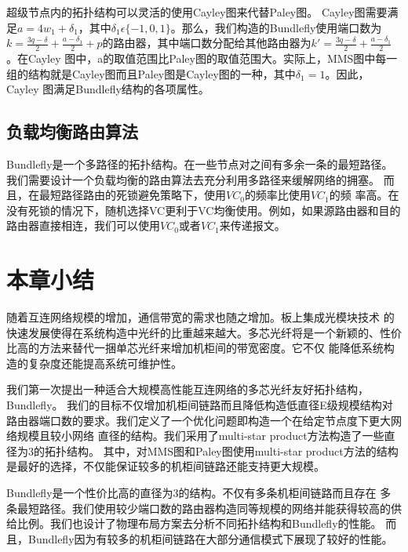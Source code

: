    超级节点内的拓扑结构可以灵活的使用Cayley图来代替Paley图。
   Cayley图需要满足$a=4w_{1}+\delta_{1}$，其中$\delta_{1}\epsilon\{-1,0,1\}$。那么，我们构造的Bundlefly使用端口数为$k=\frac{3q-\delta}{2}+\frac{a-\delta_1}{2}+p$的路由器，其中端口数分配给其他路由器为$k'=\frac{3q-\delta}{2}+\frac{a-\delta_1}{2}$。在Cayley
   图中，a的取值范围比Paley图的取值范围大。实际上，MMS图中每一组的结构就是Cayley图而且Paley图是Cayley图的一种，其中$\delta_1=1$。因此，Cayley
   图满足Bundlefly结构的各项属性。

   \subsection{负载均衡路由算法}

   Bundlefly是一个多路径的拓扑结构。在一些节点对之间有多余一条的最短路径。我们需要设计一个负载均衡的路由算法去充分利用多路径来缓解网络的拥塞。
   而且，在最短路径路由的死锁避免策略下，使用$VC_0$的频率比使用$VC_1$的频
   率高。在没有死锁的情况下，随机选择VC更利于VC均衡使用。例如，如果源路由器和目的路由器直接相连，我们可以使用$VC_0$或者$VC_1$来传递报文。

    \section{本章小结}

    随着互连网络规模的增加，通信带宽的需求也随之增加。板上集成光模块技术 的快速发展使得在系统构造中光纤的比重越来越大。多芯光纤将是一个新颖的、性价比高的方法来替代一捆单芯光纤来增加机柜间的带宽密度。它不仅
    能降低系统构造的复杂度还能提高系统可维护性。

    我们第一次提出一种适合大规模高性能互连网络的多芯光纤友好拓扑结构，Bundlefly。 我们的目标不仅增加机柜间链路而且降低构造低直径E级规模结构对路由器端口数的要求。我们定义了一个优化问题即构造一个在给定节点度下更大网络规模且较小网络
    直径的结构。我们采用了multi-star product方法构造了一些直径为3的拓扑结构。
    其中，对MMS图和Paley图使用multi-star product方法的结构是最好的选择，不仅能保证较多的机柜间链路还能支持更大规模。

    Bundlefly是一个性价比高的直径为3的结构。不仅有多条机柜间链路而且存在
    多条最短路径。我们使用较少端口数的路由器构造同等规模的网络并能获得较高的供给比例。我们也设计了物理布局方案去分析不同拓扑结构和Bundlefly的性能。
    而且，Bundlefly因为有较多的机柜间链路在大部分通信模式下展现了较好的性能。


